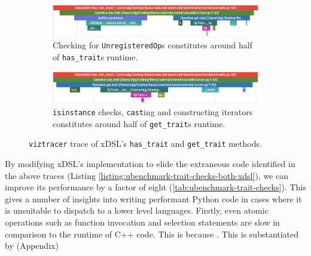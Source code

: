 \begin{figure}[H]
    \centering
    \begin{subfigure}[b]{\textwidth}
        \centering
        \includegraphics[width=\textwidth]{images/14_understanding_compiler_performance/trait_checks/hastrait_xdsl_viztracer.png}
        \caption{Checking for \texttt{UnregisteredOp}s constitutes around half of \texttt{has_trait}s runtime.}
        \label{fig:ubenchmark-hastrait-xdsl-viztracer}
    \end{subfigure}
    \begin{subfigure}[b]{\textwidth}
        \centering
        \includegraphics[width=\textwidth]{images/14_understanding_compiler_performance/trait_checks/gettrait_xdsl_viztracer.png}
        \caption{\texttt{isinstance} checks, \texttt{cast}ing and constructing iterators constitutes around half of \texttt{get_trait}s runtime.}
        \label{fig:ubenchmark-gettrait-xdsl-viztracer}
    \end{subfigure}
    \caption{\texttt{viztracer} trace of xDSL's \texttt{has_trait} and \texttt{get_trait} methods.}
    \label{fig:ubenchmark-hasgettrait-xdsl-viztracer}
\end{figure}

By modifying xDSL's implementation to elide the extraneous code identified in the above traces (Listing \ref{listing:ubenchmark-trait-checks-both-xdsl}), we can improve its performance by a factor of eight (\autoref{tab:ubenchmark-trait-checks}).
This gives a number of insights into writing performant Python code in cases where it is unsuitable to dispatch to a lower level languages.
Firstly, even atomic operations such as function invocation and selection statements are slow in comparison to the runtime of C++ code.
This is because \cite{}. This is substantiated by (Appendix)


